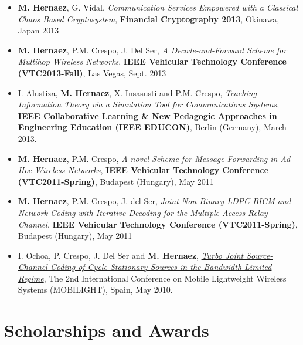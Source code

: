 \documentclass[11pt,a4paper,sans]{moderncv}        %
\begin{document}
\begin{itemize}
\item \textbf{M. Hernaez}, G. Vidal, {\emph {Communication Services Empowered with a Classical Chaos Based Cryptosystem}, \textbf{Financial Cryptography 2013}}, Okinawa, Japan 2013 \\

\item \textbf{M. Hernaez}, P.M. Crespo, J. {Del Ser}, {\emph{A Decode-and-Forward Scheme for Multihop Wireless Networks}, \textbf{IEEE Vehicular Technology Conference (VTC2013-Fall)}}, Las Vegas, Sept. 2013\\

\item I. Alustiza, \textbf{M. Hernaez}, X. Insasusti and P.M. Crespo, {\emph{ Teaching Information Theory via a Simulation Tool for Communications Systems}}, \textbf{IEEE Collaborative Learning \& New Pedagogic Approaches in Engineering Education (IEEE EDUCON)}, Berlin (Germany), March  2013.\\

\item \textbf{M. Hernaez}, P.M. Crespo, \emph{A novel Scheme for Message-Forwarding in Ad-Hoc Wireless Networks}, \textbf{IEEE Vehicular Technology Conference (VTC2011-Spring)}, Budapest (Hungary), May 2011 \\

\item \textbf{M. Hernaez}, P.M. Crespo, J. del Ser, \emph{ Joint Non-Binary LDPC-BICM and Network Coding with Iterative Decoding for the Multiple Access Relay Channel}, \textbf{IEEE Vehicular Technology Conference (VTC2011-Spring)}, Budapest (Hungary),  May 2011 \\

\item {I. Ochoa, P. Crespo, J. Del Ser and \textbf{M. Hernaez}, \href{http://web.stanford.edu/~iochoa/publishedPublications/2010_mobilight.pdf}{\emph{ Turbo Joint Source-Channel Coding of Cycle-Stationary Sources in the Bandwidth-Limited Regime}}, The 2nd International Conference on Mobile Lightweight Wireless Systems (MOBILIGHT), Spain, May 2010.}\\
 
 \end{itemize}

\section{Scholarships and Awards}

\end{document}
